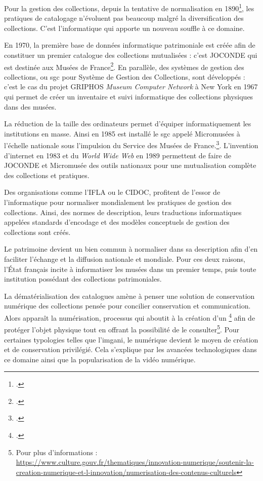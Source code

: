 Pour la gestion des collections, depuis la tentative de normalisation en 1890\footcite{denoelLapportLeopoldDelisle2019}, les pratiques de catalogage n'évoluent pas beaucoup malgré la diversification des collections. C'est l'informatique qui apporte un nouveau souffle à ce domaine.\newline 
		
En 1970, la première base de données informatique patrimoniale est créée afin de constituer un premier catalogue des collections mutualisées : c'est JOCONDE qui est destinée aux Musées de France\footcite[p. 2]{verdierSystemeDescriptifObjets1999}. En parallèle, des systèmes de gestion des collections, ou \gls{sgc} pour Système de Gestion des Collections, sont développés : c'est le cas du projet GRIPHOS \textit{Museum Computer Network} à New York en 1967 qui permet de créer un inventaire et suivi informatique des collections physiques dans des musées. 
		
La réduction de la taille des ordinateurs permet d'équiper informatiquement les institutions en masse. Ainsi en 1985 est installé le \gls{sgc} appelé Micromusées à l'échelle nationale sous l'impulsion du Service des Musées de France.\footcite[p.2]{dejantiMuseologieInformatiqueLoeuvre2018}. L'invention d'internet en 1983 et du \textit{World Wide Web} en 1989 permettent de faire de JOCONDE et Micromusée des outils nationaux pour une mutualisation complète des collections et pratiques.
		
Des organisations comme l'\gls{IFLA} ou le \gls{CIDOC}, profitent de l'essor de l'informatique pour normaliser mondialement les pratiques de gestion des collections. Ainsi, des normes de description, leurs traductions informatiques appelées standards d'encodage et des modèles conceptuels de gestion des collections sont créés.
		
Le patrimoine devient un bien commun à normaliser dans sa description afin d'en faciliter l'échange et la diffusion nationale et mondiale. Pour ces deux raisons, l'État français incite à informatiser les musées dans un premier temps, puis toute institution possédant des collections patrimoniales.\newline
		
La dématérialisation des catalogues amène à penser une solution de conservation numérique des collections pensée pour concilier conservation et communication. Alors apparaît la numérisation, processus qui aboutit à la création d'un  \footcite{bergeotJumeauNumeriqueDans2025} afin de protéger l'objet physique tout en offrant la possibilité de le consulter\footnote{Pour plus d'informations : \url{https://www.culture.gouv.fr/thematiques/innovation-numerique/soutenir-la-creation-numerique-et-l-innovation/numerisation-des-contenus-culturels}}. Pour certaines typologies telles que l'\gls{imgani}, le numérique devient le moyen de création et de conservation privilégié. Cela s'explique par les avancées technologiques dans ce domaine ainsi que la popularisation de la vidéo numérique. 
		
